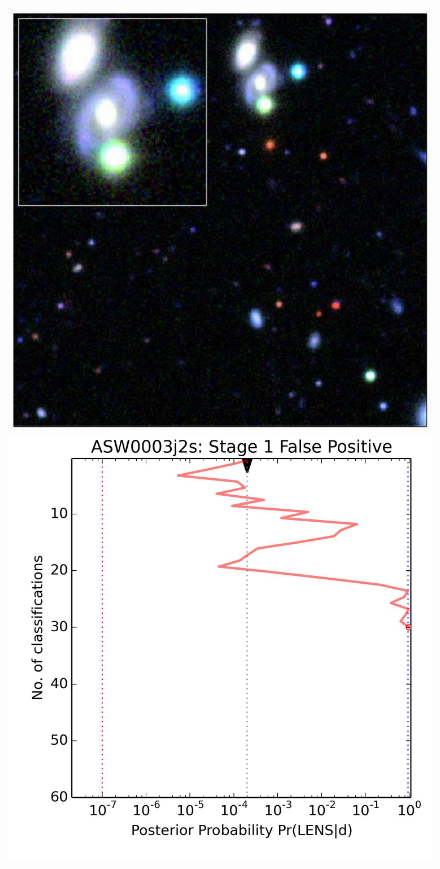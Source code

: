 \documentclass[useAMS,usenatbib,a4paper]{mn2e}
\begin{document}
\begin{figure}
\begin{minipage}{\linewidth}
\begin{minipage}[t]{0.47\linewidth}
\begin{minipage}{0.50\linewidth}
    \end{minipage}
  \end{minipage}\hfill
  \begin{minipage}[t]{0.47\linewidth}
    \begin{minipage}{0.46\linewidth}
      \centering\includegraphics[width=\linewidth]{ASW0003j2s_gri.pdf}
    \end{minipage}\hfill
    \begin{minipage}{0.50\linewidth}
      \centering\includegraphics[width=\linewidth]{ASW0003j2s_stage1_trajectory.pdf}

\end{minipage}
\end{minipage}
\end{minipage}
\end{figure}
\end{document}
